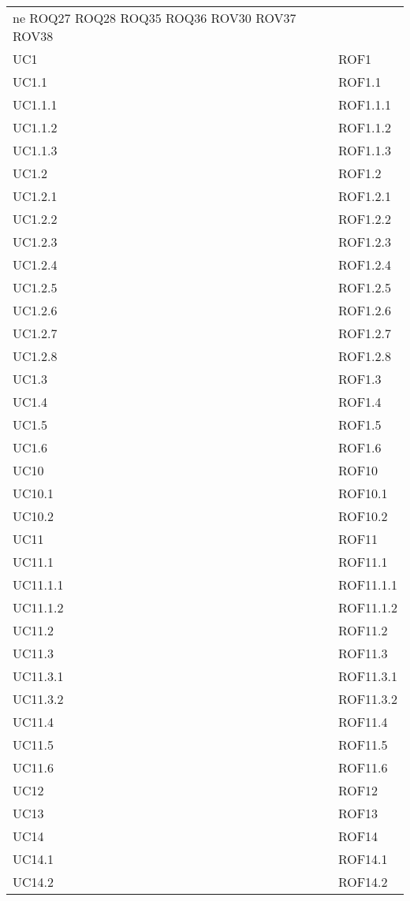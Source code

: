 \begin{longtable}{p{2.5cm}!{\VRule[1pt]}p{2.5cm}}
ne ROQ27 \newline ROQ28 \newline ROQ35 \newline ROQ36 \newline ROV30 \newline ROV37 \newline ROV38\\
	UC1 & ROF1\\
	UC1.1 & ROF1.1\\
	UC1.1.1 & ROF1.1.1\\
	UC1.1.2 & ROF1.1.2\\
	UC1.1.3 & ROF1.1.3\\
	UC1.2 & ROF1.2\\
	UC1.2.1 & ROF1.2.1\\
	UC1.2.2 & ROF1.2.2\\
	UC1.2.3 & ROF1.2.3\\
	UC1.2.4 & ROF1.2.4\\
	UC1.2.5 & ROF1.2.5\\
	UC1.2.6 & ROF1.2.6\\
	UC1.2.7 & ROF1.2.7\\
	UC1.2.8 & ROF1.2.8\\
	UC1.3 & ROF1.3\\
	UC1.4 & ROF1.4\\
	UC1.5 & ROF1.5\\
	UC1.6 & ROF1.6\\
	UC10 & ROF10\\
	UC10.1 & ROF10.1\\
	UC10.2 & ROF10.2\\
	UC11 & ROF11\\
	UC11.1 & ROF11.1\\
	UC11.1.1 & ROF11.1.1\\
	UC11.1.2 & ROF11.1.2\\
	UC11.2 & ROF11.2\\
	UC11.3 & ROF11.3\\
	UC11.3.1 & ROF11.3.1\\
	UC11.3.2 & ROF11.3.2\\
	UC11.4 & ROF11.4\\
	UC11.5 & ROF11.5\\
	UC11.6 & ROF11.6\\
	UC12 & ROF12\\
	UC13 & ROF13\\
	UC14 & ROF14\\
	UC14.1 & ROF14.1\\
	UC14.2 & ROF14.2\\

\end{longtable}
